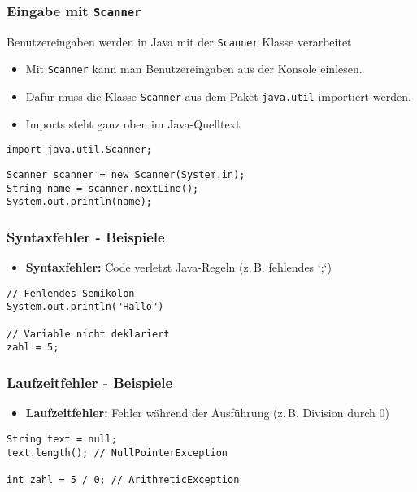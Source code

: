 \documentclass{../../presentation}
\begin{document}
\begin{frame}[fragile]
\end{frame}

\begin{frame}[fragile]
  \frametitle{Eingabe mit \texttt{Scanner}}
  \pause
  Benutzereingaben werden in Java mit der \texttt{Scanner} Klasse verarbeitet
  \pause
  \begin{itemize}
    \item Mit \texttt{Scanner} kann man Benutzereingaben aus der Konsole einlesen.
          \pause
    \item Dafür muss die Klasse \texttt{Scanner} aus dem Paket \texttt{java.util} importiert werden.
          \pause
    \item Imports steht ganz oben im Java-Quelltext
  \end{itemize}
  \pause
  \begin{verbatim}
import java.util.Scanner;
\end{verbatim}
  \pause
  \begin{verbatim}
Scanner scanner = new Scanner(System.in);
String name = scanner.nextLine();
System.out.println(name);
  \end{verbatim}
\end{frame}

\begin{frame}[fragile]
  \frametitle{Syntaxfehler - Beispiele}
  \pause
  \begin{itemize}
    \item \textbf{Syntaxfehler:} Code verletzt Java-Regeln (z.\,B. fehlendes `;`)
  \end{itemize}
  \begin{verbatim}
// Fehlendes Semikolon
System.out.println("Hallo")

// Variable nicht deklariert
zahl = 5;
  \end{verbatim}
\end{frame}

\begin{frame}[fragile]
  \frametitle{Laufzeitfehler - Beispiele}
  \begin{itemize}
    \item \textbf{Laufzeitfehler:} Fehler während der Ausführung (z.\,B. Division durch 0)
  \end{itemize}
  \begin{verbatim}
String text = null;
text.length(); // NullPointerException

int zahl = 5 / 0; // ArithmeticException
  \end{verbatim}
\end{frame}
\end{document}
